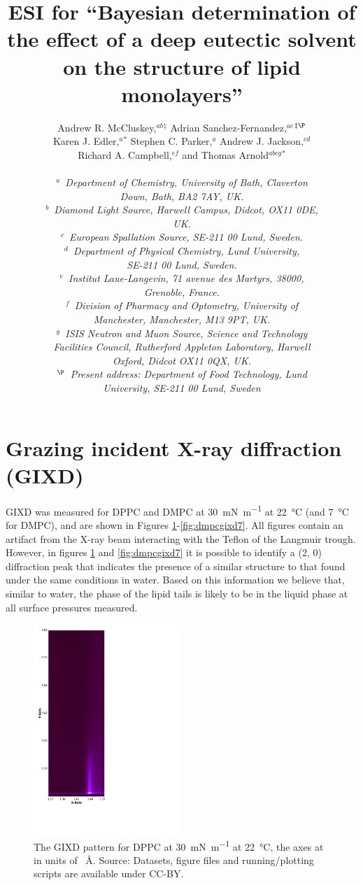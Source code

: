\documentclass[11pt,a4paper]{article}
\author{Andrew R. McCluskey,\textit{$^{ab}$}$^{\ddag}$ Adrian Sanchez-Fernandez,\textit{$^{ac}$}$^{\ddag\P}$ \\
Karen J. Edler,\textit{$^{a}$}$^{\ast}$ Stephen C. Parker,\textit{$^{a}$} Andrew J. Jackson,\textit{$^{cd}$} \\
Richard A. Campbell,\textit{$^{ef}$} and Thomas Arnold\textit{$^{abcg}$}$^{\ast}$ \\
 \\
\textit{$^{a}$~Department of Chemistry, University of Bath, Claverton} \\
\textit{Down, Bath, BA2 7AY, UK.} \\
\textit{$^{b}$~Diamond Light Source, Harwell Campus, Didcot, OX11 0DE,} \\
\textit{UK.} \\
\textit{$^{c}$~European Spallation Source, SE-211 00 Lund, Sweden.} \\
\textit{$^{d}$~Department of Physical Chemistry, Lund University,} \\
\textit{SE-211 00 Lund, Sweden.} \\
\textit{$^{e}$~Institut Laue-Langevin, 71 avenue des Martyrs, 38000,} \\
\textit{Grenoble, France.} \\
\textit{$^{f}$~Division of Pharmacy and Optometry, University of} \\
\textit{Manchester, Manchester, M13 9PT, UK.} \\
\textit{$^{g}$~ISIS Neutron and Muon Source, Science and Technology} \\
\textit{Facilities Council, Rutherford Appleton Laboratory, Harwell} \\
\textit{Oxford, Didcot OX11 0QX, UK.} \\
\textit{$^{\P}$~Present address: Department of Food Technology, Lund} \\
\textit{University, SE-211 00 Lund, Sweden}}
\title{ESI for ``Bayesian determination of the effect of a deep eutectic solvent on the structure of lipid monolayers''}
\date{}
\begin{document}
\maketitle
\section{Grazing incident X-ray diffraction (GIXD)}
GIXD was measured for DPPC and DMPC at \SI{30}{\milli\newton\per\meter} at \SI{22}{\celsius} (and \SI{7}{\celsius} for DMPC), and are shown in Figures \ref{fig:dppcgixd}-\ref{fig:dmpcgixd7}. All figures contain an artifact from the X-ray beam interacting with the Teflon of the Langmuir trough. However, in figures \ref{fig:dppcgixd} and \ref{fig:dmpcgixd7} it is possible to identify a (2, 0) diffraction peak that indicates the presence of a similar structure to that found under the same conditions in water.\cite{Watkins2009} Based on this information we believe that, similar to water, the phase of the lipid tails is likely to be in the liquid phase at all surface pressures measured.
\begin{figure}[h]
	\centering
	\includegraphics[width=0.50\textwidth]{figures/206041}
	\caption{The GIXD pattern for DPPC at \SI{30}{\milli\newton\per\meter} at \SI{22}{\celsius}, the axes at in units of \si{\per\angstrom}. Source: Datasets, figure files and running/plotting scripts are available under CC-BY.\cite{mccluskey_2018}}
	\label{fig:dppcgixd}
\end{figure}
\end{document}
